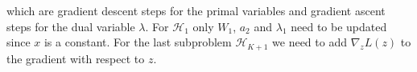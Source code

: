 \documentclass[english,11pt,a4paper]{article}
\begin{document}
which are gradient descent steps for the primal variables and gradient ascent steps for the dual variable $\lambda$. For $\mathcal{H}_1$ only $W_1$, $a_2$ and $\lambda_1$ need to be updated since $x$ is a constant. For the last subproblem $\mathcal{H}_{K+1}$ we need to add $\nabla_zL(z)$ to the gradient with respect to $z$.

\pagebreak

\printbibliography
\end{document}
